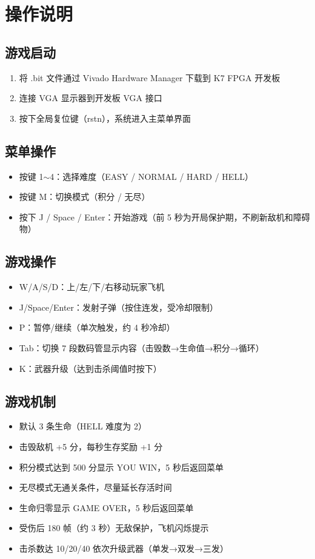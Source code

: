 \documentclass[12pt,a4paper]{ctexart}
\begin{document}
\section{操作说明}

\subsection{游戏启动}
\begin{enumerate}[label=(\arabic*)]
    \item 将 .bit 文件通过 Vivado Hardware Manager 下载到 K7 FPGA 开发板
    \item 连接 VGA 显示器到开发板 VGA 接口
    \item 按下全局复位键（rstn），系统进入主菜单界面
\end{enumerate}

\subsection{菜单操作}
\begin{itemize}
    \item 按键 1$\sim$4：选择难度（EASY / NORMAL / HARD / HELL）
    \item 按键 M：切换模式（积分 / 无尽）
    \item 按下 J / Space / Enter：开始游戏（前 5 秒为开局保护期，不刷新敌机和障碍物）
\end{itemize}

\subsection{游戏操作}
\begin{itemize}
    \item W/A/S/D：上/左/下/右移动玩家飞机
    \item J/Space/Enter：发射子弹（按住连发，受冷却限制）
    \item P：暂停/继续（单次触发，约 4 秒冷却）
    \item Tab：切换 7 段数码管显示内容（击毁数→生命值→积分→循环）
    \item K：武器升级（达到击杀阈值时按下）
\end{itemize}

\subsection{游戏机制}
\begin{itemize}
    \item 默认 3 条生命（HELL 难度为 2）
    \item 击毁敌机 +5 分，每秒生存奖励 +1 分
    \item 积分模式达到 500 分显示 YOU WIN，5 秒后返回菜单
    \item 无尽模式无通关条件，尽量延长存活时间
    \item 生命归零显示 GAME OVER，5 秒后返回菜单
    \item 受伤后 180 帧（约 3 秒）无敌保护，飞机闪烁提示
    \item 击杀数达 10/20/40 依次升级武器（单发→双发→三发）
\end{itemize}
\end{document}
